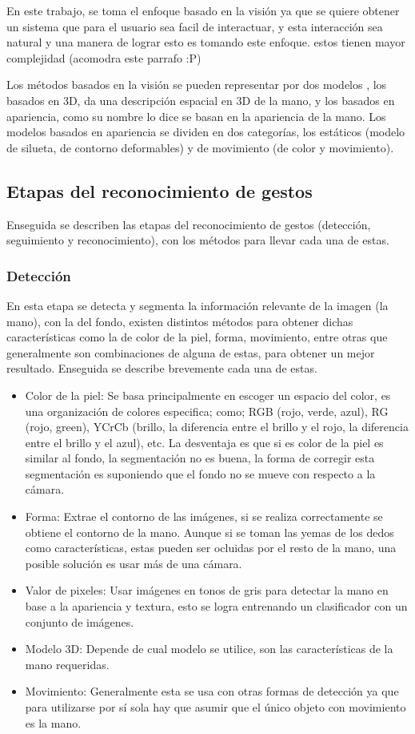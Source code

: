 En este trabajo, se toma el enfoque basado en la visi\'on ya que se quiere obtener un sistema que para el usuario sea facil de interactuar, y esta interacci\'on sea natural y una manera de lograr esto es tomando este enfoque.  estos tienen mayor complejidad (acomodra este parrafo :P)


Los métodos basados en la visión se pueden representar por dos modelos \citep{Rautaray2012}, los basados en 3D, da una descripción espacial en 3D de la mano, y los basados en apariencia, como su nombre lo dice se basan en la apariencia de la mano. Los modelos basados en apariencia se dividen en dos categorías, los estáticos (modelo de silueta, de contorno deformables) y de movimiento (de color y movimiento).

\subsection{Etapas del reconocimiento de gestos}
Enseguida se describen las etapas del reconocimiento de gestos (detección, seguimiento y reconocimiento), con los métodos para llevar cada una de estas.  



\subsubsection{Detección}

En esta etapa se detecta y segmenta la información relevante de la imagen (la mano), con la del fondo, existen distintos métodos para obtener dichas características como la de color de la piel, forma, movimiento, entre otras que generalmente son combinaciones de alguna de estas, para obtener un mejor resultado. Enseguida se describe brevemente cada una de estas.  
\begin{itemize}
\item Color de la piel: Se basa principalmente en escoger un espacio del color, es una organización de colores especifica; como; RGB (rojo, verde, azul), RG (rojo, green), YCrCb (brillo, la diferencia entre el brillo y el rojo, la diferencia entre el brillo y el azul), etc. La desventaja es que si es color de la piel es similar al fondo, la segmentación no es buena, la forma de corregir esta segmentación es suponiendo que el fondo no se mueve con respecto a la cámara.
\item Forma: Extrae el contorno de las imágenes, si se realiza correctamente se obtiene el contorno de la mano. Aunque si se toman las yemas de los dedos como características, estas pueden ser ocluidas por el resto de la mano, una posible solución es usar más de una cámara.  
\item Valor de pixeles: Usar imágenes en tonos de gris para detectar la mano en base a la apariencia y textura, esto se logra entrenando un clasificador con un conjunto de imágenes.
	\item Modelo 3D: Depende de cual modelo se utilice, son las características de la mano requeridas. 
	\item Movimiento: Generalmente esta se usa con otras formas de detección ya que para utilizarse por sí sola hay que asumir que el único objeto con movimiento es la mano.
\end{itemize}

